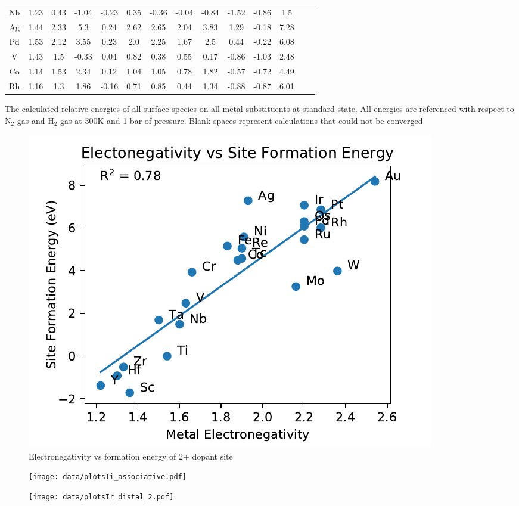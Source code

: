 \begin{center}
\begin{tabular}{| c | c | c | c | c | c | c | c | c | c | c | c | c | c |}
Nb & 1.23 & 0.43 & -1.04 & -0.23 & 0.35 & -0.36 & -0.04 & -0.84 & -1.52 & -0.86 & 1.5 \\
Ag & 1.44 & 2.33 & 5.3 & 0.24 & 2.62 & 2.65 & 2.04 & 3.83 & 1.29 & -0.18 & 7.28 \\
Pd & 1.53 & 2.12 & 3.55 & 0.23 & 2.0 & 2.25 & 1.67 & 2.5 & 0.44 & -0.22 & 6.08 \\
V & 1.43 & 1.5 & -0.33 & 0.04 & 0.82 & 0.38 & 0.55 & 0.17 & -0.86 & -1.03 & 2.48 \\
Co & 1.14 & 1.53 & 2.34 & 0.12 & 1.04 & 1.05 & 0.78 & 1.82 & -0.57 & -0.72 & 4.49 \\
Rh & 1.16 & 1.3 & 1.86 & -0.16 & 0.71 & 0.85 & 0.44 & 1.34 & -0.88 & -0.87 & 6.01 \\
\hline
\end{tabular}
\caption{The calculated relative energies of all surface species on all metal substituents at standard state. All energies are referenced with respect to N$_2$ gas and H$_2$ gas at 300K and 1 bar of pressure. Blank spaces represent calculations that could not be converged}
\label{table:energies}
\end{center}



\begin{figure}
\centering
\includegraphics[width=0.8\linewidth]{Images/electronegativity_vs_formation.pdf}
\caption{Electronegativity vs formation energy of 2+ dopant site}
\end{figure}

\begin{figure}
\centering
\texttt{[image: data/plotsTi\_associative.pdf]}
\end{figure}

\begin{figure}
\centering
\texttt{[image: data/plotsIr\_distal\_2.pdf]}
\end{figure}

